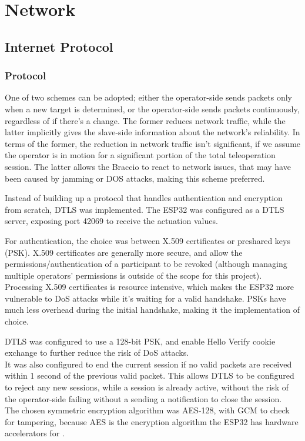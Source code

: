 \chapter{Network}\label{ch:net}

\section{Internet Protocol}

\subsection{Protocol}
One of two schemes can be adopted; either the operator-side sends packets only when a new target is determined, or the operator-side sends packets continuously, regardless of if there's a change. The former reduces network traffic, while the latter implicitly gives the slave-side information about the network's reliability. In terms of the former, the reduction in network traffic isn't significant, if we assume the operator is in motion for a significant portion of the total teleoperation session. The latter allows the Braccio to react to network issues, that may have been caused by jamming or DOS attacks, making this scheme preferred.

Instead of building up a protocol that handles authentication and encryption from scratch, DTLS was implemented. The ESP32 was configured as a DTLS server, exposing port 42069 to receive the actuation values.

For authentication, the choice was between X.509 certificates or preshared keys (PSK). X.509 certificates are generally more secure, and allow the permissions/authentication of a participant to be revoked (although managing multiple operators' permissions is outside of the scope for this project). Processing X.509 certificates is resource intensive, which makes the ESP32 more vulnerable to DoS attacks while it's waiting for a valid handshake. PSKs have much less overhead during the initial handshake, making it the implementation of choice.

DTLS was configured to use a 128-bit PSK, and enable Hello Verify cookie exchange to further reduce the risk of DoS attacks.\\
It was also configured to end the current session if no valid packets are received within 1 second of the previous valid packet. This allows DTLS to be configured to reject any new sessions, while a session is already active, without the risk of the operator-side failing without a sending a notification to close the session.\\
The chosen symmetric encryption algorithm was AES-128, with GCM to check for tampering, because AES is the encryption algorithm the ESP32 has hardware accelerators for \cite{bib:esp32-d0wdq6}.

